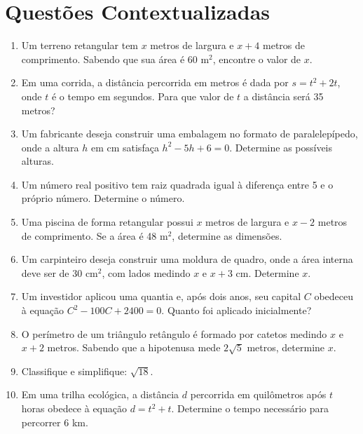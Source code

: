 \documentclass[12pt,a4paper]{article}
\begin{document}
\section*{Questões Contextualizadas}

\begin{enumerate}

\item Um terreno retangular tem \(x\) metros de largura e \(x+4\) metros de comprimento. Sabendo que sua \'{a}rea \'e 60 m$^2$, encontre o valor de \(x\).

\item Em uma corrida, a dist\^{a}ncia percorrida em metros \'e dada por \(s = t^2 + 2t\), onde \(t\) \'e o tempo em segundos. Para que valor de \(t\) a dist\^{a}ncia ser\'a 35 metros?

\item Um fabricante deseja construir uma embalagem no formato de paralelep\'ipedo, onde a altura \(h\) em cm satisfa\c{c}a \(h^2 - 5h + 6 = 0\). Determine as poss\'iveis alturas.

\item Um n\'umero real positivo tem raiz quadrada igual \`a diferen\c{c}a entre 5 e o pr\'oprio n\'umero. Determine o n\'umero.

\item Uma piscina de forma retangular possui \(x\) metros de largura e \(x-2\) metros de comprimento. Se a \'{a}rea \'e 48 m$^2$, determine as dimens\~oes.

\item Um carpinteiro deseja construir uma moldura de quadro, onde a \'{a}rea interna deve ser de 30 cm$^2$, com lados medindo \(x\) e \(x+3\) cm. Determine \(x\).

\item Um investidor aplicou uma quantia e, ap\'os dois anos, seu capital \(C\) obedeceu \`a equa\c{c}\~ao \(C^2 - 100C + 2400 = 0\). Quanto foi aplicado inicialmente?

\item O per\'imetro de um tri\^angulo ret\^angulo \'e formado por catetos medindo \(x\) e \(x+2\) metros. Sabendo que a hipotenusa mede \(2\sqrt{5}\) metros, determine \(x\).

\item Classifique e simplifique: \(\sqrt{18}\).

\item Em uma trilha ecol\'ogica, a dist\^{a}ncia \(d\) percorrida em quil\^ometros ap\'os \(t\) horas obedece \`a equa\c{c}\~ao \(d = t^2 + t\). Determine o tempo necess\'ario para percorrer 6 km.


\end{enumerate}
\end{document}
